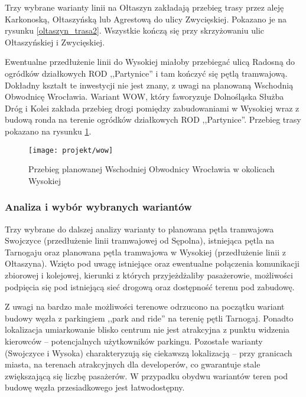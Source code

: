 \documentclass[twoside,12pt]{article}
\begin{document}
	Trzy wybrane warianty linii na Ołtaszyn zakładają przebieg trasy przez aleję Karkonoską, Ołtaszyńską lub Agrestową do ulicy Zwycięskiej. Pokazano je na rysunku \ref{oltaszyn_trasa2}. Wszystkie kończą się przy skrzyżowaniu ulic Ołtaszyńskiej i Zwycięskiej.
	
	Ewentualne przedłużenie linii do Wysokiej miałoby przebiegać ulicą Radosną do ogródków działkowych ROD ,,Partynice'' i tam kończyć się pętlą tramwajową. Dokładny kształt te inwestycji nie jest znany, z uwagi na planowaną Wschodnią Obwodnicę Wrocławia. Wariant WOW, który faworyzuje Dolnośląska Służba Dróg i Kolei zakłada przebieg drogi pomiędzy zabudowaniami w Wysokiej wraz z budową ronda na terenie ogródków działkowych ROD ,,Partynice''. Przebieg trasy pokazano na rysunku \ref{wow}.
	
	\begin{figure}[H]
		\centering
		\texttt{[image: projekt/wow]}\\
		\caption{Przebieg planowanej Wschodniej Obwodnicy Wrocławia w okolicach Wysokiej}
		\label{wow}
	\end{figure}		
	
	\subsubsection{Analiza i wybór wybranych wariantów}
	
	Trzy wybrane do dalszej analizy warianty to planowana pętla tramwajowa Swojczyce (przedłużenie linii tramwajowej od Sępolna), istniejąca pętla na Tarnogaju oraz planowana pętla tramwajowa w Wysokiej (przedłużenie linii z Ołtaszyna). Wzięto pod uwagę istniejące oraz ewentualne połączenia komunikacji zbiorowej i kolejowej, kierunki z których przyjeżdżaliby pasażerowie, możliwości podpięcia się pod istniejącą sieć drogową oraz dostępność terenu pod zabudowę.
	
	Z uwagi na bardzo małe możliwości terenowe odrzucono na początku wariant budowy węzła z parkingiem ,,park and ride'' na terenię pętli Tarnogaj. Ponadto lokalizacja umiarkowanie blisko centrum nie jest atrakcyjna z punktu widzenia kierowców -- potencjalnych użytkowników parkingu. Pozostałe warianty (Swojczyce i Wysoka) charakteryzują się ciekawszą lokalizacją -- przy granicach miasta, na terenach atrakcyjnych dla developerów, co gwarantuje stale zwiększającą się liczbę pasażerów. W przypadku obydwu wariantów teren pod budowę węzła przesiadkowego jest łatwodostępny. 
	
\end{document}
